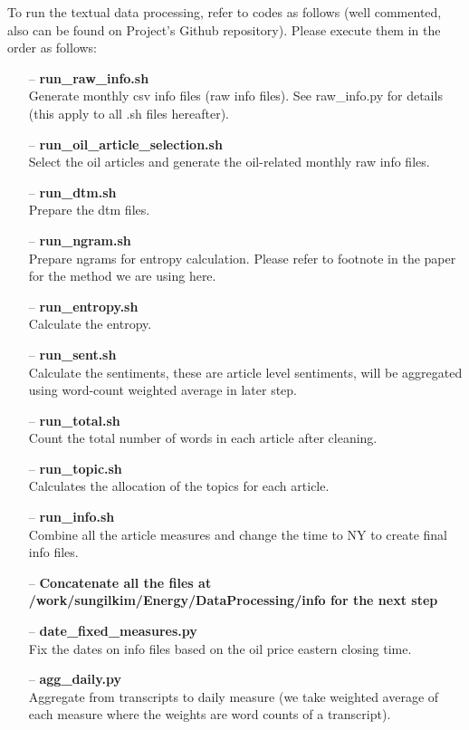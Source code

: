 \documentclass[11pt]{article}
\begin{document}
To run the textual data processing, refer to codes as follows (well commented, also can be found on Project's Github repository). Please execute them in the order as follows:
\begin{enumerate}
	\item[--] \textbf{run\_raw\_info.sh}\\
	Generate monthly csv info files (raw info files). See raw\_info.py for details (this apply to all .sh files hereafter).
	\item[--] \textbf{run\_oil\_article\_selection.sh}\\
	Select the oil articles and generate the oil-related monthly raw info files.
	\item[--] \textbf{run\_dtm.sh}\\
	Prepare the dtm files.
	\item[--] \textbf{run\_ngram.sh}\\
	Prepare ngrams for entropy calculation. Please refer to footnote in the paper for the method we are using here.
	\item[--] \textbf{run\_entropy.sh}\\
	Calculate the entropy.
	\item[--] \textbf{run\_sent.sh}\\
	Calculate the sentiments, these are article level sentiments, will be aggregated using word-count weighted average in later step.
	\item[--] \textbf{run\_total.sh}\\
	Count the total number of words in each article after cleaning.
	\item[--] \textbf{run\_topic.sh}\\
	Calculates the allocation of the topics for each article.
	\item[--] \textbf{run\_info.sh}\\
	Combine all the article measures and change the time to NY to create final info files.
	\item[--] \textbf{Concatenate all the files at /work/sungilkim/Energy/DataProcessing/info for the next step}
	\item[--] \textbf{date\_fixed\_measures.py}\\
	Fix the dates on info files based on the oil price eastern closing time.
	\item[--] \textbf{agg\_daily.py}\\
	Aggregate from transcripts to daily measure (we take weighted average of each measure where the weights are word counts of a transcript).
\end{enumerate}
\end{document}
